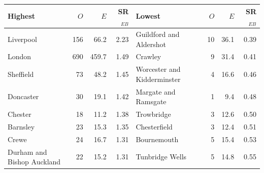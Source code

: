 \begin{tabular}{lrrrlrrr}
\toprule
Highest & $O$ & $E$ & SR$_{EB}$ & Lowest & $O$ & $E$ & SR$_{EB}$
\\
\midrule
Liverpool & 156 & 66.2 & 2.23 & Guildford and Aldershot & 10 & 36.1 & 0.39 \\
London & 690 & 459.7 & 1.49 & Crawley & 9 & 31.4 & 0.41 \\
Sheffield & 73 & 48.2 & 1.45 & Worcester and Kidderminster & 4 & 16.6 & 0.46 \\
Doncaster & 30 & 19.1 & 1.42 & Margate and Ramsgate & 1 & 9.4 & 0.48 \\
Chester & 18 & 11.2 & 1.38 & Trowbridge & 3 & 12.6 & 0.50 \\
Barnsley & 23 & 15.3 & 1.35 & Chesterfield & 3 & 12.4 & 0.51 \\
Crewe & 24 & 16.7 & 1.31 & Bournemouth & 5 & 15.4 & 0.53 \\
Durham and Bishop Auckland & 22 & 15.2 & 1.31 & Tunbridge Wells & 5 & 14.8 & 0.55 \\
\bottomrule
\end{tabular}
